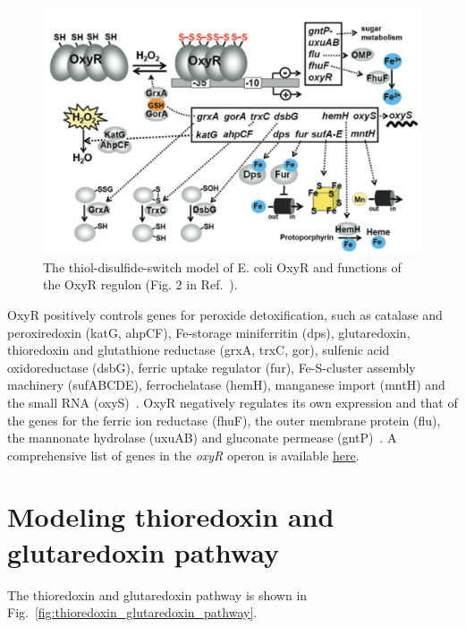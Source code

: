 \documentclass[10pt]{article}
\begin{document}
\begin{figure}[h!]
\centering
  \includegraphics[width=0.75\linewidth]{oxyr_redox_sensing_regulation.png}
  \caption{The thiol-disulfide-switch model of E. coli OxyR and functions of the OxyR regulon (Fig. 2 in Ref.~\cite{antelmann2011thiol}).}
  \label{fig:oxyr_redox_sensing_regulation}
\end{figure}

OxyR positively controls genes for peroxide detoxification, such as catalase and peroxiredoxin (katG, ahpCF), Fe-storage miniferritin (dps), glutaredoxin, thioredoxin and glutathione reductase (grxA, trxC, gor), sulfenic acid oxidoreductase (dsbG), ferric uptake regulator (fur), Fe-S-cluster assembly machinery (sufABCDE), ferrochelatase (hemH), manganese import (mntH) and the small RNA (oxyS)~\cite{hillion2015thiol}. OxyR negatively regulates its own expression and that of the genes for the ferric ion reductase (fhuF), the outer membrane protein (flu), the mannonate hydrolase (uxuAB) and gluconate permease (gntP)~\cite{hillion2015thiol}. A comprehensive list of genes in the \textit{oxyR} operon is available \href{https://ecocyc.org/gene?orgid=ECOLI\&id=EG10681\#tab=REGULON}{here}. 

\clearpage

\section{Modeling thioredoxin and glutaredoxin pathway}

The thioredoxin and glutaredoxin pathway is shown in Fig.~\ref{fig:thioredoxin_glutaredoxin_pathway}.
\end{document}
